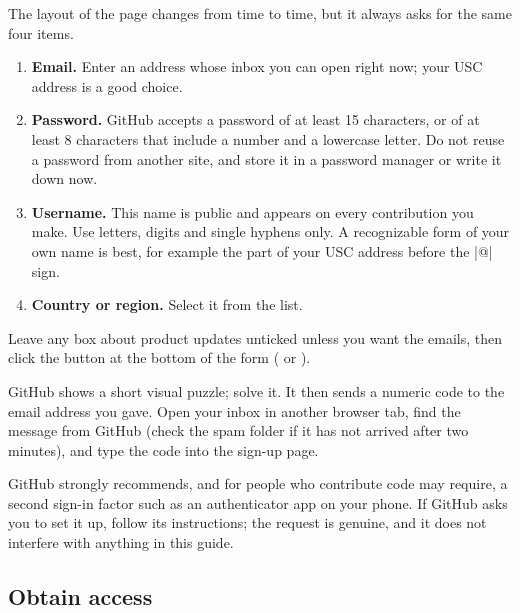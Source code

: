 The layout of the page changes from time to time, but it always asks for the same four items.
\begin{enumerate}
\item \textbf{Email.} Enter an address whose inbox you can open right now; your USC address is a
  good choice.
\item \textbf{Password.} GitHub accepts a password of at least 15 characters, or of at least 8
  characters that include a number and a lowercase letter. Do not reuse a password from another
  site, and store it in a password manager or write it down now.
\item \textbf{Username.} This name is public and appears on every contribution you make. Use
  letters, digits and single hyphens only. A recognizable form of your own name is best, for
  example the part of your USC address before the \code|@| sign.
\item \textbf{Country or region.} Select it from the list.
\end{enumerate}
Leave any box about product updates unticked unless you want the emails, then click the button
at the bottom of the form ( or ).

GitHub shows a short visual puzzle; solve it. It then sends a numeric code to the email address
you gave. Open your inbox in another browser tab, find the message from GitHub (check the spam
folder if it has not arrived after two minutes), and type the code into the sign-up page.

\begin{note}
GitHub strongly recommends, and for people who contribute code may require, a second sign-in
factor such as an authenticator app on your phone. If GitHub asks you to set it up, follow its
instructions; the request is genuine, and it does not interfere with anything in this guide.
\end{note}

\subsection{Obtain access}

